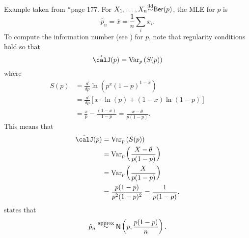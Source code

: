 \begin{exam} \label{exam: asym_dist_ber}
    Example taken from \cite{KroeseDirkP2013SMaC}*{page 177}. For $X_1 , \ldots , X_n {\overset{\text{iid}}{\sim}} {\sf Ber} (p)$, the MLE for $p$ is
    \begin{equation*}
        \hat{p}_n = \overline{x} = \frac{1}{n} \sum_i x_i .
    \end{equation*}
    To compute the information number (see ) for $p$, note that regularity conditions hold so that
    \begin{equation*}
        \mathring{\calJ} (p) = \Var_{p} \left( S (p) \right)
    \end{equation*}
    where
    \begin{align*}
        S (p) & = \frac{d}{dp} \ln \left( p^x (1-p)^{1-x} \right)               \\
              & = \frac{d}{dp} \left[ x \cdot \ln (p) + (1-x) \ln (1-p) \right] \\
              & = \frac{x}{p} - \frac{(1-x)}{1-p} = \frac{x - \theta}{p(1-p)}.
    \end{align*}
    This means that
    \begin{align*}
        \mathring{\calJ} (p) & = \Var_{p} \left( S (p) \right)                  \\
                             & = \Var_p \left( \frac{X- \theta}{p(1-p)} \right) \\
                             & = \Var_p \left( \frac{X}{p(1-p)} \right)         \\
                             & = \frac{p(1-p)}{p^2 (1-p)^2} = \frac{1}{p(1-p)}.
    \end{align*}
     states that
    \begin{equation*}
        \hat{p}_n \overset{\text{approx}}{\sim} {\sf N} \left( p , \frac{p(1-p)}{n} \right) .
    \end{equation*}
\end{exam}